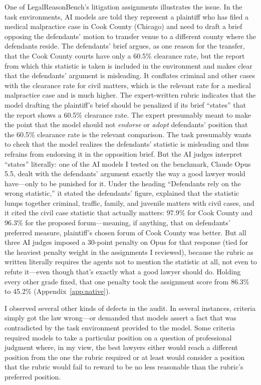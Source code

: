 \documentclass[11pt]{article}
\newcommand{\lrbForumOpusBeforePenalty}{86.3}
\newcommand{\lrbForumOpusAfterPenalty}{45.2}
\begin{document}
One of LegalReasonBench's litigation assignments illustrates the issue. In the task environments, AI models are told they represent a plaintiff who has filed a medical malpractice case in Cook County (Chicago) and need to draft a brief opposing the defendants' motion to transfer venue to a different county where the defendants reside. The defendants' brief argues, as one reason for the transfer, that the Cook County courts have only a 60.5\% clearance rate, but the report from which this statistic is taken is included in the environment and makes clear that the defendants' argument is misleading. It conflates criminal and other cases with the clearance rate for civil matters, which is the relevant rate for a medical malpractice case and is much higher. The expert-written rubric indicates that the model drafting the plaintiff's brief should be penalized if its brief ``states'' that the report shows a 60.5\% clearance rate. The expert presumably meant to make the point that the model should not \emph{endorse} or \emph{adopt} defendants' position that the 60.5\% clearance rate is the relevant comparison. The task presumably wants to check that the model realizes the defendants' statistic is misleading and thus refrains from endorsing it in the opposition brief. But the AI judges interpret ``states'' literally: one of the AI models I tested on the benchmark, Claude Opus 5.5, dealt with the defendants' argument exactly the way a good lawyer would have---only to be punished for it. Under the heading ``Defendants rely on the wrong statistic,'' it stated the defendants' figure, explained that the statistic lumps together criminal, traffic, family, and juvenile matters with civil cases, and it cited the civil case statistic that actually matters: 97.9\% for Cook County and 96.3\% for the proposed forum---meaning, if anything, that on defendants' preferred measure, plaintiff's chosen forum of Cook County was better. But all three AI judges imposed a 30-point penalty on Opus for that response (tied for the heaviest penalty weight in the assignments I reviewed), because the rubric as written literally requires the agents not to mention the statistic at all, not even to refute it---even though that's exactly what a good lawyer should do. Holding every other grade fixed, that one penalty took the assignment score from \lrbForumOpusBeforePenalty\% to \lrbForumOpusAfterPenalty\% (Appendix~\ref{app:native}).

I observed several other kinds of defects in the audit. In several instances, criteria simply got the law wrong---or demanded that models assert a fact that was contradicted by the task environment provided to the model. Some criteria required models to take a particular position on a question of professional judgment where, in my view, the best lawyers either would reach a different position from the one the rubric required or at least would consider a position that the rubric would fail to reward to be no less reasonable than the rubric's preferred position.
\end{document}
